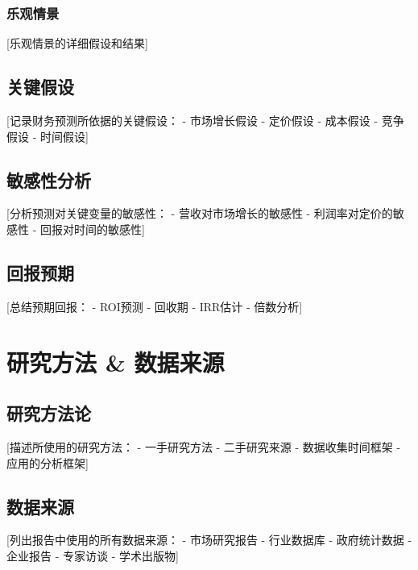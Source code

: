 \documentclass[11pt,letterpaper]{report}
\begin{document}
{\subsection{乐观情景}
[乐观情景的详细假设和结果]

\section{关键假设}

[记录财务预测所依据的关键假设：
- 市场增长假设
- 定价假设
- 成本假设
- 竞争假设
- 时间假设]

\section{敏感性分析}

[分析预测对关键变量的敏感性：
- 营收对市场增长的敏感性
- 利润率对定价的敏感性
- 回报对时间的敏感性]

\section{回报预期}

[总结预期回报：
- ROI预测
- 回收期
- IRR估计
- 倍数分析]

\appendix

\chapter{研究方法 \& 数据来源}

\section{研究方法论}

[描述所使用的研究方法：
- 一手研究方法
- 二手研究来源
- 数据收集时间框架
- 应用的分析框架]

\section{数据来源}

[列出报告中使用的所有数据来源：
- 市场研究报告
- 行业数据库
- 政府统计数据
- 企业报告
- 专家访谈
- 学术出版物]

}
\end{document}
